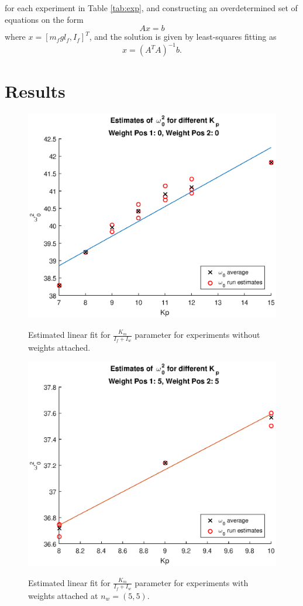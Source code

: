 \documentclass[12pt]{article}
\begin{document}
for each experiment in Table \ref{tab:exp}, and constructing an overdetermined set of equations on the form
\begin{equation}
Ax=b
\end{equation}
where $ x = [m_fgl_f, I_f]^T$, and the solution is given by least-squares fitting as
\begin{equation}
x = \left(A^TA\right)^{-1}b.
\end{equation}

\section{Results}

\begin{figure}[htbp]
\includegraphics[scale=1]{gfx/km_00}
\label{fig:km_00}
\caption{Estimated linear fit for $\frac{K_m}{I_f+I_w}$ parameter for experiments without weights attached.}
\end{figure}

\begin{figure}[htbp]
\includegraphics[scale=1]{gfx/km_55}
\label{fig:km_55}
\caption{Estimated linear fit for $\frac{K_m}{I_f+I_w}$ parameter for experiments with weights attached at $n_w = (5,5)$.}
\end{figure}
\end{document}
